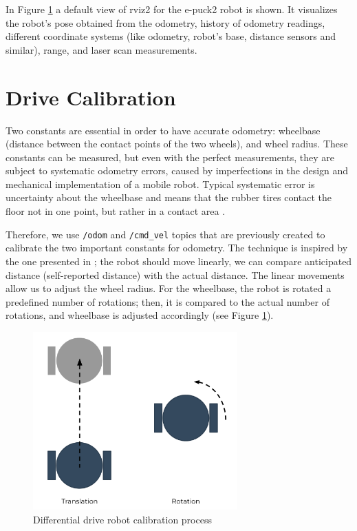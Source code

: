 In Figure \ref{fig:demos:rviz} a default view of \acs{rviz2} for the e-puck2 robot is shown.
It visualizes the robot's pose obtained from the odometry, history of odometry readings, different coordinate systems (like odometry, robot's base, distance sensors and similar), range, and laser scan measurements.

\section{Drive Calibration}

Two constants are essential in order to have accurate odometry: wheelbase (distance between the contact points of the two wheels), and wheel radius.
These constants can be measured, but even with the perfect measurements, they are subject to systematic odometry errors, caused by imperfections in the design and mechanical implementation of a mobile robot.
Typical systematic error is uncertainty about the wheelbase and means that the rubber tires contact the floor not in one point, but rather in a contact area \cite{borenstein_measurement_1996}.

Therefore, we use \texttt{/odom} and \texttt{/cmd\_vel} topics that are previously created to calibrate the two important constants for odometry.
The technique is inspired by the one presented in \cite{borenstein_measurement_1996}; the robot should move linearly, we can compare anticipated distance (self-reported distance) with the actual distance.
The linear movements allow us to adjust the wheel radius.
For the wheelbase, the robot is rotated a predefined number of rotations; then, it is compared to the actual number of rotations, and wheelbase is adjusted accordingly (see Figure \ref{fig:demos:rviz}).

\begin{figure}[H]
    \centering
    \includegraphics[width=0.7\textwidth]{demos/figures/calibration.pdf}
    \caption{Differential drive robot calibration process}
    \label{fig:demos:rviz}
\end{figure}

